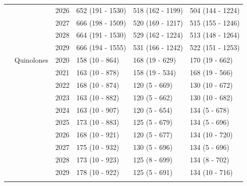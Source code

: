 \documentclass[
]{article}
\begin{document}
\begin{landscape}
\begin{longtable}[t]{llrlll}
\cmidrule{3-6}\nopagebreak
\hspace{1em} &  & 2026 & 652 (191 - 1530) & 518 (162 - 1199) & 504 (144 - 1224)\\
\cmidrule{3-6}\nopagebreak
\hspace{1em} &  & 2027 & 666 (198 - 1509) & 520 (169 - 1217) & 515 (155 - 1246)\\
\cmidrule{3-6}\nopagebreak
\hspace{1em} &  & 2028 & 664 (191 - 1530) & 529 (162 - 1224) & 513 (148 - 1264)\\
\cmidrule{3-6}\nopagebreak
\hspace{1em} &  & 2029 & 666 (194 - 1555) & 531 (166 - 1242) & 522 (151 - 1253)\\
\cmidrule{2-6}\nopagebreak
\hspace{1em} & Quinolones & 2020 & 158 (10 - 864) & 168 (19 - 629) & 170 (19 - 662)\\
\cmidrule{3-6}\nopagebreak
\hspace{1em} &  & 2021 & 163 (10 - 878) & 158 (19 - 534) & 168 (19 - 566)\\
\cmidrule{3-6}\nopagebreak
\hspace{1em} &  & 2022 & 168 (10 - 874) & 120 (5 - 669) & 130 (10 - 672)\\
\cmidrule{3-6}\nopagebreak
\hspace{1em} &  & 2023 & 163 (10 - 882) & 120 (5 - 662) & 130 (10 - 682)\\
\cmidrule{3-6}\nopagebreak
\hspace{1em} &  & 2024 & 163 (10 - 907) & 120 (5 - 654) & 134 (5 - 678)\\
\cmidrule{3-6}\nopagebreak
\hspace{1em} &  & 2025 & 173 (10 - 883) & 125 (5 - 679) & 134 (5 - 696)\\
\cmidrule{3-6}\nopagebreak
\hspace{1em} &  & 2026 & 168 (10 - 921) & 120 (5 - 677) & 134 (10 - 720)\\
\cmidrule{3-6}\nopagebreak
\hspace{1em} &  & 2027 & 175 (10 - 932) & 130 (5 - 696) & 134 (5 - 696)\\
\cmidrule{3-6}\nopagebreak
\hspace{1em} &  & 2028 & 173 (10 - 923) & 125 (8 - 699) & 134 (8 - 702)\\
\cmidrule{3-6}\nopagebreak
\hspace{1em} &  & 2029 & 178 (10 - 922) & 125 (5 - 691) & 134 (10 - 716)\\
\cmidrule{2-6}\nopagebreak

\end{longtable}
\end{landscape}
\end{document}
